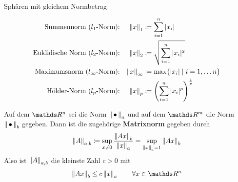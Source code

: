 \begin{Wdhe}[Normen]~
  \label{3.2.3}
  \begin{image}{Sphären mit gleichem Normbetrag}
  \end{image}
  
  \begin{align*}
    \text{Summennorm ($l_1$-Norm):} 
    && \nn[x]_1 &\coloneqq \sum_{i=1}^{n}|x_i| 
                  \index{Norm!Summennorm}\\
    \text{Euklidische Norm ($l_2$-Norm):} 
    && \nn[x]_2 &\coloneqq \sqrt{\sum_{i=1}^{n}|x_i|^2}
                  \index{Norm!Euklidische Norm} \\
    \text{Maximumsnorm ($l_\infty$-Norm):} 
    && \nn[x]_\infty &\coloneqq \max\{|x_i| \mid i=1, \dotsc n\}
                       \index{Norm!Maximumsnorm} \\
    \text{Hölder-Norm ($l_p$-Norm):} 
    && \nn[x]_p &\coloneqq \left(\sum_{i=1}^{n}|x_i|^p\right)^{\frac{1}{p}} 
                  \index{Norm!Hölder-Norm}
  \end{align*}
\end{Wdhe}



\begin{Defe}\label{3.2.4}
  Auf dem $\R^n$  sei die Norm $\nn_a$ und auf dem $\R^m$ die Norm $\nn_b$ gegeben.
  Dann ist die zugehörige \textbf{Matrixnorm} 
  gegeben durch
  \begin{gather}
    \nn[A]_{a,b} \coloneqq \sup_{x\neq 0} \frac{\nn[Ax]_b}{\nn[x]_a}
    = \sup_{\nn[x]_a=1} \nn[Ax]_b \label{III.2.1} 
  \end{gather}
  Also ist   $\nn[A]_{a,b}$ die kleinste Zahl $c>0$ mit
  \begin{gather*}
    \nn[Ax]_b  \leq c\nn[x]_a \quad\quad \forall x\in \R^n
  \end{gather*}
\end{Defe}

